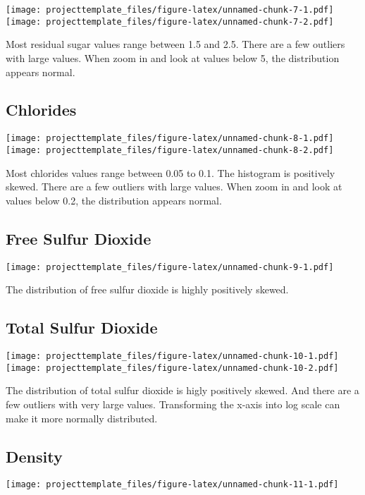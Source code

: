 \documentclass[]{article}
\begin{document}
\texttt{[image: projecttemplate\_files/figure-latex/unnamed-chunk-7-1.pdf]}
\texttt{[image: projecttemplate\_files/figure-latex/unnamed-chunk-7-2.pdf]}

Most residual sugar values range between 1.5 and 2.5. There are a few
outliers with large values. When zoom in and look at values below 5, the
distribution appears normal.

\subsection{Chlorides}\label{chlorides}

\texttt{[image: projecttemplate\_files/figure-latex/unnamed-chunk-8-1.pdf]}
\texttt{[image: projecttemplate\_files/figure-latex/unnamed-chunk-8-2.pdf]}

Most chlorides values range between 0.05 to 0.1. The histogram is
positively skewed. There are a few outliers with large values. When zoom
in and look at values below 0.2, the distribution appears normal.

\subsection{Free Sulfur Dioxide}\label{free-sulfur-dioxide}

\texttt{[image: projecttemplate\_files/figure-latex/unnamed-chunk-9-1.pdf]}

The distribution of free sulfur dioxide is highly positively skewed.

\subsection{Total Sulfur Dioxide}\label{total-sulfur-dioxide}

\texttt{[image: projecttemplate\_files/figure-latex/unnamed-chunk-10-1.pdf]}
\texttt{[image: projecttemplate\_files/figure-latex/unnamed-chunk-10-2.pdf]}

The distribution of total sulfur dioxide is higly positively skewed. And
there are a few outliers with very large values. Transforming the x-axis
into log scale can make it more normally distributed.

\subsection{Density}\label{density}

\texttt{[image: projecttemplate\_files/figure-latex/unnamed-chunk-11-1.pdf]}
\end{document}
